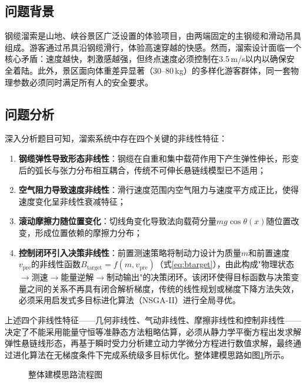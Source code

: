 \documentclass[12pt,a4paper]{ctexart}
\begin{document}
\subsection{问题背景}

钢缆溜索是山地、峡谷景区广泛设置的体验项目，由两端固定的主钢缆和滑动吊具组成。游客通过吊具沿钢缆滑行，体验高速穿越的快感。然而，溜索设计面临一个核心矛盾：速度越快，刺激感越强，但终点速度必须控制在3.5\,m/s以内以确保安全着陆。此外，景区面向体重差异显著（30--80\,kg）的多样化游客群体，同一套物理参数必须同时满足所有人的安全要求。

\subsection{问题分析}

深入分析题目可知，溜索系统中存在四个关键的非线性特征：

\begin{enumerate}[label=(\arabic*),leftmargin=2em]
  \item \textbf{钢缆弹性导致形态非线性}：钢缆在自重和集中载荷作用下产生弹性伸长，形变后的弧长与张力分布相互耦合，传统不可伸长悬链线模型已不适用；
  \item \textbf{空气阻力导致速度非线性}：滑行速度范围内空气阻力与速度平方成正比，使得速度变化呈非线性衰减特征；
  \item \textbf{滚动摩擦力随位置变化}：切线角变化导致法向载荷分量$mg\cos\theta(x)$随位置改变，形成位置依赖的摩擦力分布；
  \item \textbf{控制闭环引入决策非线性}：前置测速策略将制动力设计为质量$m$和前置速度$v_{\text{pre}}$的非线性函数$B_{\text{target}}=f(m,v_{\text{pre}})$（式\ref{eq:btarget}），由此构成"物理状态$\to$测速$\to$能量逆解$\to$制动输出"的决策闭环。该闭环使得目标函数与决策变量之间的关系不再具有闭合解析梯度，传统的线性规划或梯度下降方法失效，必须采用启发式多目标进化算法（NSGA-II）进行全局寻优。
\end{enumerate}

上述四个非线性特征——几何非线性、气动非线性、摩擦非线性和控制非线性——决定了不能采用能量守恒等准静态方法粗略估算，必须从静力学平衡方程出发求解弹性悬链线形态，再基于瞬时受力分析建立动力学微分方程进行数值求解，最终通过进化算法在无梯度条件下完成系统级多目标优化。整体建模思路如图\ref{fig:workflow}所示。

\begin{figure}[H]
  \centering
  \caption{整体建模思路流程图}
  \label{fig:workflow}
\end{figure}
\end{document}
